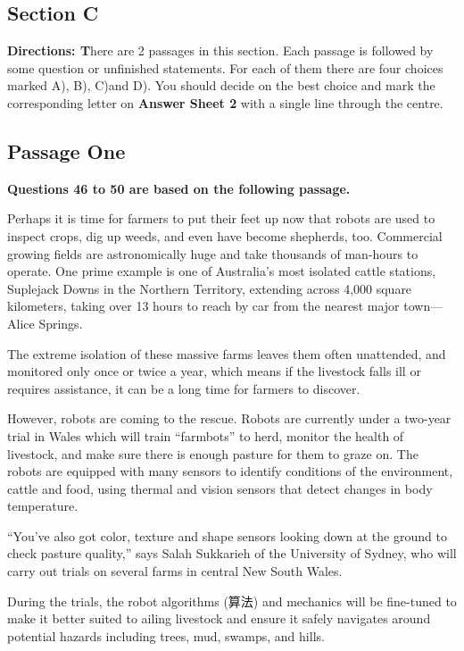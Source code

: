 \documentclass[UTF8,11pt]{ctexart}
\begin{document}
\subsection*{\textbf{Section C}}


\textbf{Directions: T}here are 2 passages in this section. Each passage is followed by some question or unfinished statements. For each of them there are four choices marked A), B), C)and D). You should decide on the best choice and mark the corresponding letter on\textbf{ Answer Sheet 2} with a single line through the centre.


\subsection*{\textbf{Passage One}}


\textbf{Questions 46 to 50 are based on the following passage.}


Perhaps it is time for farmers to put their feet up now that robots are used to inspect crops, dig up weeds, and even have become shepherds, too. Commercial growing fields are astronomically huge and take thousands of man-hours to operate. One prime example is one of Australia’s most isolated cattle stations, Suplejack Downs in the Northern Territory, extending across 4,000 square kilometers, taking over 13 hours to reach by car from the nearest major town—Alice Springs.


The extreme isolation of these massive farms leaves them often unattended, and monitored only once or twice a year, which means if the livestock falls ill or requires assistance, it can be a long time for farmers to discover.


However, robots are coming to the rescue. Robots are currently under a two-year trial in Wales which will train “farmbots” to herd, monitor the health of livestock, and make sure there is enough pasture for them to graze on. The robots are equipped with many sensors to identify conditions of the environment, cattle and food, using thermal and vision sensors that detect changes in body temperature.


“You’ve also got color, texture and shape sensors looking down at the ground to check pasture quality,” says Salah Sukkarieh of the University of Sydney, who will carry out trials on several farms in central New South Wales.


During the trials, the robot algorithms (算法) and mechanics will be fine-tuned to make it better suited to ailing livestock and ensure it safely navigates around potential hazards including trees, mud, swamps, and hills.
\end{document}
